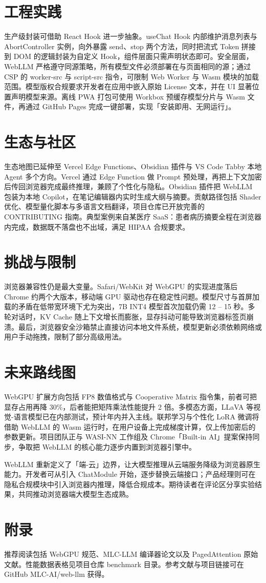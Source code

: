 \chapter{工程实践}
生产级封装可借助 React Hook 进一步抽象。useChat Hook 内部维护消息列表与 AbortController 实例，向外暴露 send、stop 两个方法，同时把流式 Token 拼接到 DOM 的逻辑封装为自定义 Hook，组件层面只需声明状态即可。安全层面，WebLLM 严格遵守同源策略，所有模型文件必须部署在与页面相同的源；通过 CSP 的 worker-src 与 script-src 指令，可限制 Web Worker 与 Wasm 模块的加载范围。模型版权合规要求开发者在应用中嵌入原始 License 文本，并在 UI 显著位置声明模型来源。离线 PWA 打包可使用 Workbox 预缓存模型分片与 Wasm 文件，再通过 GitHub Pages 完成一键部署，实现「安装即用、无网运行」。\par
\chapter{生态与社区}
生态地图已延伸至 Vercel Edge Functions、Obsidian 插件与 VS Code Tabby 本地 Agent 多个方向。Vercel 通过 Edge Function 做 Prompt 预处理，再把上下文加密后传回浏览器完成最终推理，兼顾了个性化与隐私。Obsidian 插件把 WebLLM 包装为本地 Copilot，在笔记编辑器内实时生成大纲与摘要。贡献路径包括 Shader 优化、模型量化脚本与多语言文档翻译，项目仓库已开放完善的 CONTRIBUTING 指南。典型案例来自某医疗 SaaS：患者病历摘要全程在浏览器内完成，数据既不落盘也不出域，满足 HIPAA 合规要求。\par
\chapter{挑战与限制}
浏览器兼容性仍是最大变量。Safari/WebKit 对 WebGPU 的实现进度落后 Chrome 约两个大版本，移动端 GPU 驱动也存在稳定性问题。模型尺寸与首屏加载的矛盾在低带宽环境下尤为突出，7B INT4 模型首次加载仍需 12 – 15 秒。多轮对话时，KV Cache 随上下文增长而膨胀，显存抖动可能导致浏览器标签页崩溃。最后，浏览器安全沙箱禁止直接访问本地文件系统，模型更新必须依赖网络或用户手动拖拽，限制了部分高级用法。\par
\chapter{未来路线图}
WebGPU 扩展方向包括 FP8 数值格式与 Cooperative Matrix 指令集，前者可把显存占用再降 30\%{}，后者能把矩阵乘法性能提升 2 倍。多模态方面，LLaVA 等视觉-语言模型已在内部测试，预计年内并入主线。联邦学习与个性化 LoRA 微调将借助 WebLLM 的 Wasm 运行时，在用户设备上完成梯度计算，仅上传加密后的参数更新。项目团队正与 WASI-NN 工作组及 Chrome「Built-in AI」提案保持同步，争取把 WebLLM 的核心能力逐步内置到浏览器引擎中。\par
WebLLM 重新定义了「端-云」边界，让大模型推理从云端服务降级为浏览器原生能力。开发者可从引入 ChatModule 开始，逐步替换云端接口；产品经理则可在隐私合规模块中引入浏览器内推理，降低合规成本。期待读者在评论区分享实验结果，共同推动浏览器端大模型生态成熟。\par
\chapter{附录}
推荐阅读包括 WebGPU 规范、MLC-LLM 编译器论文以及 PagedAttention 原始文献。性能数据表格见项目仓库 benchmark 目录。参考文献与项目链接可在 GitHub MLC-AI/web-llm 获得。\par
